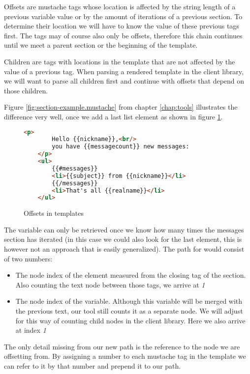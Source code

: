 \documentclass[thesis.tex]{subfiles}
\begin{document}
Offsets are mustache tags whose location is affected by the string length of a
previous variable value or by the amount of iterations of a previous section.
To determine their location we will have to know the value of these previous
tags first. The tags may of course also only be offsets, therefore this chain
continues until we meet a parent section or the beginning of the template.

Children are tags with locations in the template that are not affected by
the value of a previous tag.
When parsing a rendered template in the client library, we will want to parse
all children first and continue with offsets that depend on those children.

Figure \ref{fig:section-example.mustache} from chapter \ref{chap:tools}
illustrates the difference very well, once we add a last list element as
shown in figure \ref{fig:offsets.mustache}.
\begin{figure}
	\centering
	\begin{lstlisting}[language=HTML]
	<p>
		Hello {{nickname}},<br/>
		you have {{messagecount}} new messages:
	</p>
	<ul>
		{{#messages}}
		<li>{{subject}} from {{nickname}}</li>
		{{/messages}}
		<li>That's all {{realname}}</li>
	</ul>
	\end{lstlisting}
	\caption{Offsets in templates}
	\label{fig:offsets.mustache}
\end{figure}
The  variable can only be retrieved once we know how
many times the messages section has iterated (in this case we could also look
for the last  element, this is however not an approach that is
easily generalized). The path for  would consist of
two numbers:
\begin{itemize}
\item The node index of the  element measured from
      the closing tag of the  section.
      Also counting the text node between those tags, we arrive at \emph{1}
\item The node index of the  variable. Although this
      variable will be merged with the previous text, our tool still counts it
      as a separate node. We will adjust for this way of counting child nodes in
      the client library. Here we also arrive at index \emph{1}
\end{itemize}

The only detail missing from our new path is the reference to the node we are
offsetting from. By assigning a number to each mustache tag in the template we
can refer to it by that number and prepend it to our path.
\end{document}
